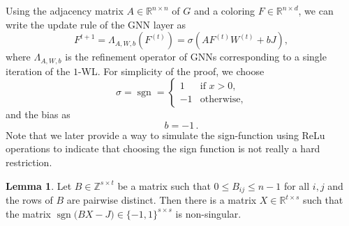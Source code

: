 \documentclass[letterpaper]{article}
\theoremstyle{definition}
\newtheorem{lemma}[theorem]{Lemma}
\newcommand{\RR}{\mathbb{R}}
\newcommand{\ZZ}{\mathbb{Z}}
\newcommand{\sgn}{\operatorname{sgn}}
\begin{document}
Using the adjacency matrix $A\in \RR^{n \times n}$ of $G$ and a coloring $F\in \RR^{n \times d}$, we can write the update rule of the GNN layer as
\begin{equation*}
	F^{t+1} = \Lambda_{A,W,b}(F^{(t)}) = \sigma( AF^{(t)}W^{(t)} + bJ),
\end{equation*}
where $\Lambda_{A,W,b}$ is the refinement operator of GNNs corresponding to a single iteration of the $1$-WL. For simplicity of the proof, we choose
\begin{equation*}
	\sigma=\sgn = 
	\begin{cases}
		1  & \text{if }x>0,    \\
		-1 & \text{otherwise}, 
	\end{cases}
\end{equation*}
and the bias as 
\begin{equation*}
	b =-1\,. 
\end{equation*}
Note that we later provide a way to simulate the sign-function using ReLu operations to indicate that choosing the sign function is not really a hard restriction.
\begin{lemma}
	\label{lem:dist2lu}
	Let $B\in\ZZ^{s\times t}$ be a matrix such that $0\le B_{ij}\le n-1$
	for all $i,j$ and the rows of $B$ are pairwise distinct. 
	Then there is a matrix $X\in\RR^{t\times s}$ such that the matrix
	$\sgn\big(BX-J)\in\{-1,1\}^{s\times s}$ is non-singular.
\end{lemma}
\end{document}
